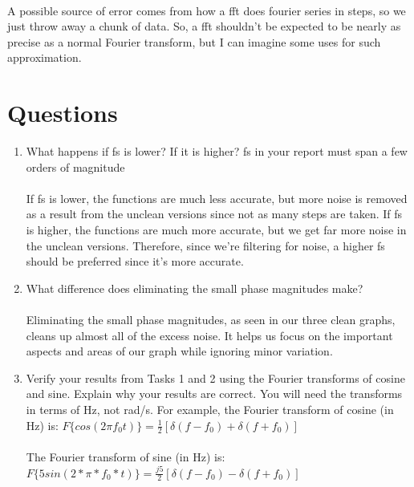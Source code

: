 \documentclass[12pt]{report}
\begin{document}
\paragraph{} A possible source of error comes from how a fft does fourier series in steps, so we just throw away a chunk of data. So, a fft shouldn't be expected to be nearly as precise as a normal Fourier transform, but I can imagine some uses for such approximation.    

\section{Questions} %
    \begin{enumerate}
        \item  What happens if fs is lower? If it is higher? fs in your report must span a few orders of magnitude
        \paragraph{} If fs is lower, the functions are much less accurate, but more noise is removed as a result from the unclean versions since not as many steps are taken. If fs is higher, the functions are much more accurate, but we get far more noise in the unclean versions. Therefore, since we're filtering for noise, a higher fs should be preferred since it's more accurate.  
        
        \item What difference does eliminating the small phase magnitudes make?
        \paragraph{} Eliminating the small phase magnitudes, as seen in our three clean graphs, cleans up almost all of the excess noise. It helps us focus on the important aspects and areas of our graph while ignoring minor variation.  
        
        \item Verify your results from Tasks 1 and 2 using the Fourier transforms of cosine and sine. Explain why your results are correct. You will need the transforms in terms of Hz, not rad/s. For example, the Fourier transform of cosine (in Hz) is:
            $F\{cos (2\pi f_0t)\} = \frac{1}{2}[\delta(f − f_0) + \delta(f + f_0)]$
        \paragraph{} The Fourier transform of sine (in Hz) is:
            $F\{5sin(2*\pi*f_0*t)\} = \frac{j5}{2}[\delta(f-f_0) - \delta(f + f_0)]$

\end{enumerate}
\end{document}
